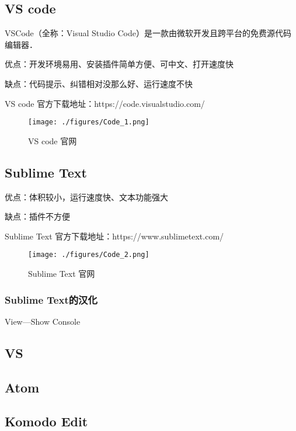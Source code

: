 
\subsection{VS code}

VSCode（全称：Visual Studio Code）是一款由微软开发且跨平台的免费源代码编辑器．

优点：开发环境易用、安装插件简单方便、可中文、打开速度快

缺点：代码提示、纠错相对没那么好、运行速度不快

VS code 官方下载地址：https://code.visualstudio.com/

\begin{figure}[ht]
\centering
\texttt{[image: ./figures/Code\_1.png]}
\caption{VS code 官网} \label{Code_fig1}
\end{figure}

\subsection{Sublime Text}

优点：体积较小，运行速度快、文本功能强大

缺点：插件不方便

Sublime Text 官方下载地址：https://www.sublimetext.com/

\begin{figure}[ht]
\centering
\texttt{[image: ./figures/Code\_2.png]}
\caption{Sublime Text 官网} \label{Code_fig2}
\end{figure}

\subsubsection{Sublime Text的汉化}

View—Show Console

\subsection{VS}

\subsection{Atom}

\subsection{Komodo Edit}
